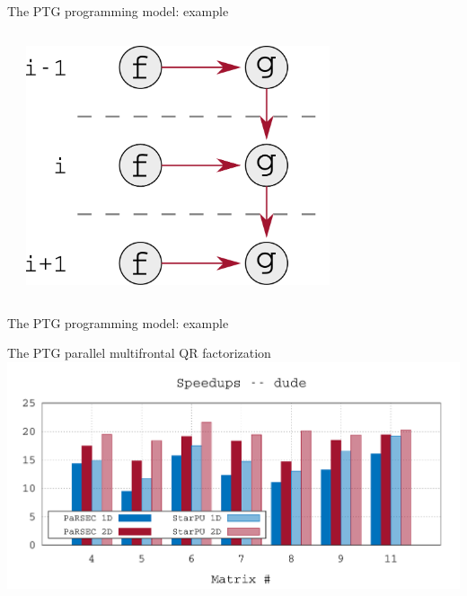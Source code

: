 \begin{frame}{The PTG programming model: example}
  \begin{columns}
    \begin{column}{0.5\textwidth}    
      
    \end{column}
    \begin{column}{0.5\textwidth}
      \includegraphics[width=0.7\textwidth]{figures/example_dag}
    \end{column}
  \end{columns}    
\end{frame}

\begin{frame}{The PTG programming model: example}
  \centering
  
\end{frame}

\begin{frame}{The PTG parallel multifrontal QR factorization}
  \centering
  \includegraphics[width=\textwidth]{data/starpu_parsec_su}
\end{frame}


